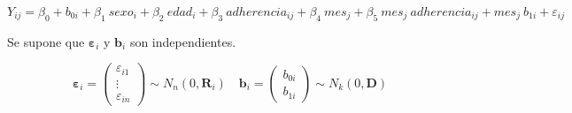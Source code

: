 \documentclass[spanish]{article}
\numberwithin{figure}{subsection}
\numberwithin{equation}{subsection}
\numberwithin{table}{subsection}
\begin{document}









\[
	Y_{ij} = \beta_0 + b_{0i} + \beta_1\ sexo_i + \beta_2\ edad_i + \beta_3\ adherencia_{ij}
	+ \beta_4\ mes_j + \beta_5\ mes_j\ adherencia_{ij} + mes_j\ b_{1i} + \varepsilon_{ij}
\]

Se supone que $\bm{\varepsilon}_i$ y $\bm{b}_i$ son independientes.

\[ 
	\bm{\varepsilon}_i = \begin{pmatrix} \varepsilon_{i1} \\ \vdots \\ \varepsilon_{in} \end{pmatrix} \sim N_{n}(0, \bm{R}_i)
	\quad
	\bm{b}_i = \begin{pmatrix} b_{0i} \\ b_{1i} \end{pmatrix} \sim N_k(0, \bm{D})
\]
\end{document}
